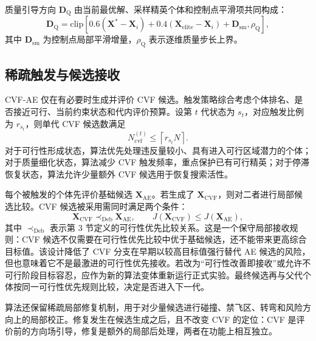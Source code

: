 质量引导方向 $\mathbf D_{\mathrm Q}$ 由当前最优解、采样精英个体和控制点平滑项共同构成：
\begin{equation}
    \mathbf D_{\mathrm Q}=
    \mathrm{clip}
    \left[
    0.6(\mathbf X^*-\mathbf X_i)
    +0.4(\mathbf X_{\mathrm{elite}}-\mathbf X_i)
    +\mathbf D_{\mathrm{sm}},
    \rho_{\mathrm Q}
    \right],
    \label{eq:quality-step}
\end{equation}
其中 $\mathbf D_{\mathrm{sm}}$ 为控制点局部平滑增量，$\rho_{\mathrm Q}$ 表示逐维质量步长上界。

\subsection{稀疏触发与候选接收}

CVF-AE 仅在有必要时生成并评价 CVF 候选。触发策略综合考虑个体排名、是否接近可行、当前约束状态和代内评价预算。设第 $t$ 代状态为 $s_t$，对应触发比例为 $r_{s_t}$，则单代 CVF 候选数满足
\begin{equation}
    N_{\mathrm{cvf}}^{(t)}\leq
    \left\lceil r_{s_t}N\right\rceil .
    \label{eq:cvf-quota}
\end{equation}
对于可行性形成状态，算法优先处理违反量较小、具有进入可行区域潜力的个体；对于质量细化状态，算法减少 CVF 触发频率，重点保护已有可行精英；对于停滞恢复状态，算法允许少量额外 CVF 候选用于恢复搜索活性。

每个被触发的个体先评价基础候选 $\mathbf{X}_{\mathrm{AE}}$。若生成了 $\mathbf{X}_{\mathrm{CVF}}$，则对二者进行局部候选比较。CVF 候选被采用需同时满足两个条件：
\begin{equation}
    \mathbf{X}_{\mathrm{CVF}}
    \prec_{\mathrm{Deb}}
    \mathbf{X}_{\mathrm{AE}},
    \qquad
    J(\mathbf{X}_{\mathrm{CVF}})
    \leq
    J(\mathbf{X}_{\mathrm{AE}}),
    \label{eq:local-cvf-accept}
\end{equation}
其中 $\prec_{\mathrm{Deb}}$ 表示第 3 节定义的可行性优先比较关系。这是一个保守局部接收规则：CVF 候选不仅需要在可行性优先比较中优于基础候选，还不能带来更高综合目标值。该设计降低了 CVF 分支在早期以较高目标值强行替代 AE 候选的风险，但也意味着它不是最激进的可行性优先接收。若改为“可行性改善即接收”或允许不可行阶段目标容忍，应作为新的算法变体重新运行正式实验。最终候选再与父代个体按同一可行性优先规则比较，决定是否进入下一代。

算法还保留稀疏局部修复机制，用于对少量候选进行碰撞、禁飞区、转弯和风险方向上的局部校正。修复发生在候选生成之后，且不改变 CVF 的定位：CVF 是评价前的方向场引导，修复是额外的局部后处理，两者在功能上相互独立。

